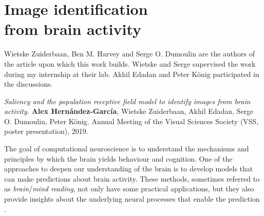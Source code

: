 {
\chapter[Image identification from brain activity]{Image identification\\from brain activity}
\label{ch:imageid}
\renewcommand{\chapterpath}{includes/image-id}
%
\begin{contributors}
    Wietske Zuiderbaan, Ben M. Harvey and Serge O. Dumoulin are the authors of the article upon which this work builds. Wietske and Serge supervised the work during my internship at their lab. Akhil Edadan and Peter K{\"onig} participated in the discussions.
\end{contributors}
%
\begin{outreach}
    \item \textit{Saliency and the population receptive field model to identify images from brain activity.} \textbf{Alex Hern{\'a}ndez-Garc{\'i}a}, Wietske Zuiderbaan, Akhil Edadan, Serge O. Dumoulin, Peter K{\"o}nig. Annual Meeting of the Visual Sciences Society (VSS, poster presentation), 2019.
\end{outreach}
%
The goal of computational neuroscience is to understand the mechanisms and principles by which the brain yields behaviour and cognition. One of the approaches to deepen our understanding of the brain is to develop models that can make predictions about brain activity. These methods, sometimes referred to as \textit{brain}/\textit{mind reading}, not only have some practical applications, but they also provide insights about the underlying neural processes that enable the prediction \citep{tong2012mindreading}. 

}
